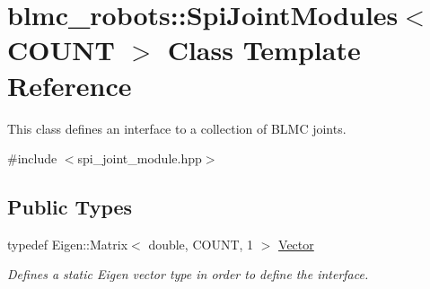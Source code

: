 \hypertarget{classblmc__robots_1_1SpiJointModules}{}\section{blmc\+\_\+robots\+:\+:Spi\+Joint\+Modules$<$ C\+O\+U\+NT $>$ Class Template Reference}
\label{classblmc__robots_1_1SpiJointModules}


This class defines an interface to a collection of B\+L\+MC joints.  




{\ttfamily \#include $<$spi\+\_\+joint\+\_\+module.\+hpp$>$}

\subsection*{Public Types}
\begin{DoxyCompactItemize}
\item 
\mbox{\label{classblmc__robots_1_1SpiJointModules_a2d48f81ec41a42a240e80cd22d4fa2f8}} 
typedef Eigen\+::\+Matrix$<$ double, C\+O\+U\+NT, 1 $>$ \hyperlink{classblmc__robots_1_1SpiJointModules_a2d48f81ec41a42a240e80cd22d4fa2f8}{Vector}
\begin{DoxyCompactList}\small\item\em Defines a static Eigen vector type in order to define the interface. \end{DoxyCompactList}\end{DoxyCompactItemize}
